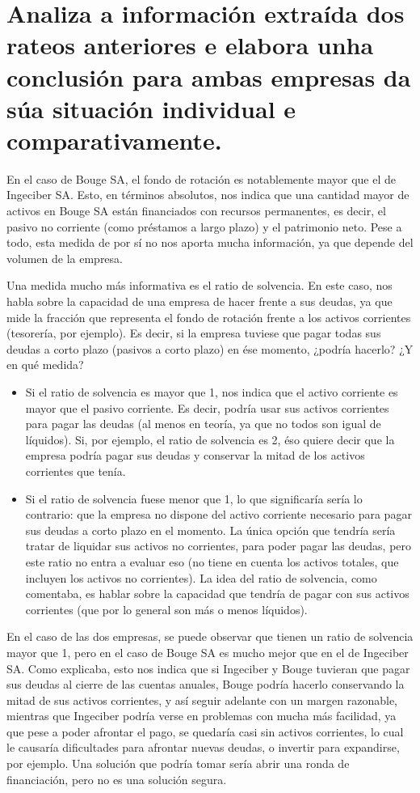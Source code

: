 \documentclass[a4paper]{article}
\begin{document}
\section{Analiza a información extraída dos rateos anteriores e elabora unha conclusión para ambas empresas da súa situación individual e comparativamente.}

En el caso de Bouge SA, el fondo de rotación es notablemente mayor que el de Ingeciber SA. Esto, en términos absolutos, nos indica que una cantidad mayor de activos en Bouge SA están financiados con recursos permanentes, es decir, el pasivo no corriente (como préstamos a largo plazo) y el patrimonio neto. Pese a todo, esta medida de por sí no nos aporta mucha información, ya que depende del volumen de la empresa.

Una medida mucho más informativa es el ratio de solvencia. En este caso, nos habla sobre la capacidad de una empresa de hacer frente a sus deudas, ya que mide la fracción que representa el fondo de rotación frente a los activos corrientes (tesorería, por ejemplo). Es decir, si la empresa tuviese que pagar todas sus deudas a corto plazo (pasivos a corto plazo) en ése momento, ¿podría hacerlo? ¿Y en qué medida?

\begin{itemize}
    \item Si el ratio de solvencia es mayor que 1, nos indica que el activo corriente es mayor que el pasivo corriente. Es decir, podría usar sus activos corrientes para pagar las deudas (al menos en teoría, ya que no todos son igual de líquidos). Si, por ejemplo, el ratio de solvencia es 2, éso quiere decir que la empresa podría pagar sus deudas y conservar la mitad de los activos corrientes que tenía.
    \item Si el ratio de solvencia fuese menor que 1, lo que significaría sería lo contrario: que la empresa no dispone del activo corriente necesario para pagar sus deudas a corto plazo en el momento. La única opción que tendría sería tratar de liquidar sus activos no corrientes, para poder pagar las deudas, pero este ratio no entra a evaluar eso (no tiene en cuenta los activos totales, que incluyen los activos no corrientes). La idea del ratio de solvencia, como comentaba, es hablar sobre la capacidad que tendría de pagar con sus activos corrientes (que por lo general son más o menos líquidos).
\end{itemize}

En el caso de las dos empresas, se puede observar que tienen un ratio de solvencia mayor que 1, pero en el caso de Bouge SA es mucho mejor que en el de Ingeciber SA. Como explicaba, esto nos indica que si Ingeciber y Bouge tuvieran que pagar sus deudas al cierre de las cuentas anuales, Bouge podría hacerlo conservando la mitad de sus activos corrientes, y así seguir adelante con un margen razonable, mientras que Ingeciber podría verse en problemas con mucha más facilidad, ya que pese a poder afrontar el pago, se quedaría casi sin activos corrientes, lo cual le causaría dificultades para afrontar nuevas deudas, o invertir para expandirse, por ejemplo. Una solución que podría tomar sería abrir una ronda de financiación, pero no es una solución segura.
\end{document}
